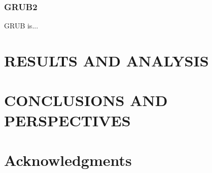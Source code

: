 \documentclass[twoside,a4paper,12pt,english]{inac17}
\begin{document}
\subsubsection{GRUB2}
\label{ssub:grub}

GRUB is...


\section{RESULTS AND ANALYSIS}



\section{CONCLUSIONS AND PERSPECTIVES}







\section*{Acknowledgments}

\end{document}
